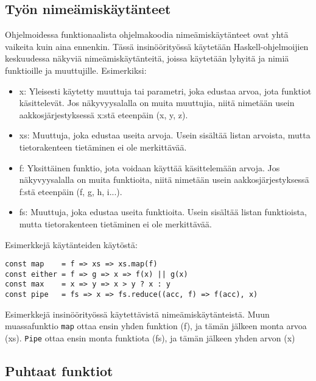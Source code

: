 \subsection{Työn nimeämiskäytänteet}

Ohjelmoidessa funktionaalista ohjelmakoodia nimeämiskäytänteet ovat yhtä vaikeita kuin aina ennenkin. Tässä insinöörityössä käytetään Haskell-ohjelmoijien keskuudessa näkyviä nimeämiskäytänteitä, joissa käytetään lyhyitä ja  nimiä funktioille ja muuttujille. Esimerkiksi:

\begin{itemize}
    \item x: Yleisesti käytetty muuttuja tai parametri, joka edustaa arvoa, jota funktiot käsittelevät. Jos näkyvyysalalla on muita muuttujia, niitä nimetään usein aakkosjärjestyksessä x:stä eteenpäin (x, y, z).
    \item xs: Muuttuja, joka edustaa useita arvoja. Usein sisältää listan arvoista, mutta tietorakenteen tietäminen ei ole merkittävää.
    \item f: Yksittäinen funktio, jota voidaan käyttää käsittelemään arvoja. Jos näkyvyysalalla on muita funktioita, niitä nimetään usein aakkosjärjestyksessä f:stä eteenpäin (f, g, h, i...).
    \item fs: Muuttuja, joka edustaa useita funktioita. Usein sisältää listan funktioista, mutta tietorakenteen tietäminen ei ole merkittävää.
\end{itemize}

Esimerkkejä käytänteiden käytöstä:

\begin{code}
    \begin{verbatim}
const map    = f => xs => xs.map(f)
const either = f => g => x => f(x) || g(x)
const max    = x => y => x > y ? x : y
const pipe   = fs => x => fs.reduce((acc, f) => f(acc), x)
\end{verbatim}
    \caption{Esimerkkejä insinöörityössä käytettävistä nimeämiskäytänteistä. Muun muassafunktio \texttt{map} ottaa ensin yhden funktion (f), ja tämän jälkeen monta arvoa (xs). \texttt{Pipe} ottaa ensin monta funktiota (fs), ja tämän jälkeen yhden arvon (x)}
    \label{code:javascript_naming_convention_example}
\end{code}

\subsection{Puhtaat funktiot}

